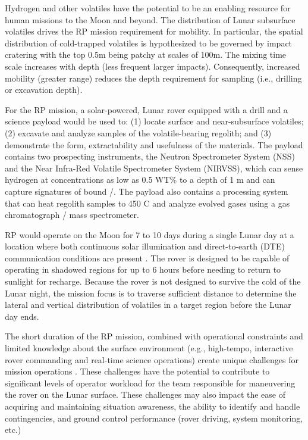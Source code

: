 \documentclass[twocolumn,letterpaper]{IEEEAerospaceCLS}  %
\begin{document}
Hydrogen and other volatiles have the potential to be an enabling resource for human missions to the Moon and beyond. 
The distribution of Lunar subsurface volatiles drives the RP mission requirement for mobility. 
In particular, the spatial distribution of cold-trapped volatiles is hypothesized to be governed by impact cratering with the top 0.5m  being patchy at scales of 100m. 
The mixing time scale increases with depth (less frequent larger impacts). 
Consequently, increased mobility (greater range) reduces the depth requirement for sampling (i.e., drilling or excavation depth). 

For the RP mission, a solar-powered, Lunar rover equipped with a drill and a science payload would be used to: (1) locate surface and near-subsurface volatiles; (2) excavate and analyze samples of the volatile-bearing regolith; and (3) demonstrate the form, extractability and usefulness of the materials. The payload contains two prospecting instruments, the Neutron Spectrometer System (NSS) and the Near Infra-Red Volatile Spectrometer System (NIRVSS), which can sense hydrogen at concentrations as low as 0.5 WT\% to a depth of 1 m and can capture signatures of bound /. The payload also contains a processing system that can heat regolith samples to 450 C and analyze evolved gases using a gas chromatograph / mass spectrometer.

RP would operate on the Moon for 7 to 10 days during a single Lunar day at a location where both continuous solar illumination and direct-to-earth (DTE) communication conditions are present \cite{trimble2016lunar}. 
The rover is designed to be capable of operating in shadowed regions for up to 6 hours before needing to return to sunlight for recharge. 
Because the rover is not designed to survive the cold of the Lunar night, the mission focus is to traverse sufficient distance to determine the lateral and vertical distribution of volatiles in a target region before the Lunar day ends.

The short duration of the RP mission, combined with operational constraints and limited knowledge about the surface environment (e.g., high-tempo, interactive rover commanding and real-time science operations) create unique challenges for mission operations \cite{hooey2017modeling}. 
These challenges have the potential to contribute to significant levels of operator workload for the team responsible for maneuvering the rover on the Lunar surface. 
These challenges may also impact the ease of acquiring and maintaining situation awareness, the ability to identify and handle contingencies, and ground control performance (rover driving, system monitoring, etc.)
\end{document}
